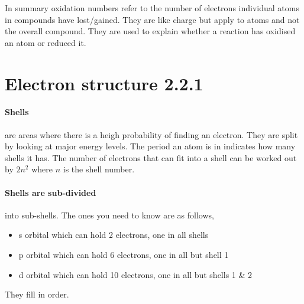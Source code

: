 \documentclass[11pt,a4paper]{memoir}
\begin{document}
	In summary oxidation numbers refer to the number of electrons individual atoms in compounds have lost/gained. They are like charge but apply to atoms and not the overall compound. They are used to explain whether a reaction has oxidised an atom or reduced it.
	
\section{Electron structure 2.2.1}

	\paragraph{Shells} are areas where there is a heigh probability of finding an electron. They are split by looking at major energy levels. The period an atom is in indicates how many shells it has. The number of electrons that can fit into a shell can be worked out by $2n^2$ where $n$ is the shell number.
	
	\paragraph{Shells are sub-divided} into sub-shells. The ones you need to know are as follows,
	\begin{itemize}
		\item s orbital which can hold 2 electrons, one in all shells
		\item p orbital which can hold 6 electrons, one in all but shell 1
		\item d orbital which can hold 10 electrons, one in all but shells 1 \& 2
	\end{itemize}
	They fill in order.
	
\end{document}
